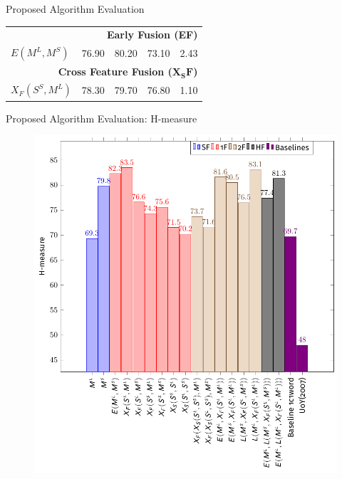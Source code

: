 \documentclass[10pt,=table]{beamer}
\newcommand\mlex{M^{\scriptscriptstyle L}}
\newcommand\msyn{M^{\scriptscriptstyle S}}
\newcommand\ssyn{S^{\scriptscriptstyle S}}
\begin{document}
\begin{frame}{Proposed Algorithm Evaluation}
\begin{overprint}
\begin{minipage}[c][.8\textheight][c]{\linewidth}
\begin{tabular}{@{}lrrrr@{}}
		    \midrule 
		    \multicolumn{5}{r}{\textbf{Early Fusion (EF)}} \\ %
   			\rowcolor{orangeEric!70} 
		    $E(\mlex, \msyn)$		&	{76.90}	& 80.20 & {73.10} & 2.43\\
			\midrule \midrule
	       \multicolumn{5}{r}{\textbf{Cross Feature Fusion ($\mathbf{X_SF}$)}}       \\
 		   \rowcolor{greenEric!70} 
       	   $X_F(\ssyn, \mlex)$		&	{78.30}	& 79.70 & {76.80}	 & 1.10 \\	   	         
       	   \bottomrule
			\end{tabular}		
		\end{minipage}
	\end{overprint}
\end{frame}




\begin{frame}{Proposed Algorithm Evaluation: H-measure}
\begin{figure}
	\centering
	\includegraphics[width=.66\linewidth]{image2/Chapitre4/proposed_hmeasure_bars.pdf}
\end{figure}
\end{frame}





%
%
%
%
\end{document}
